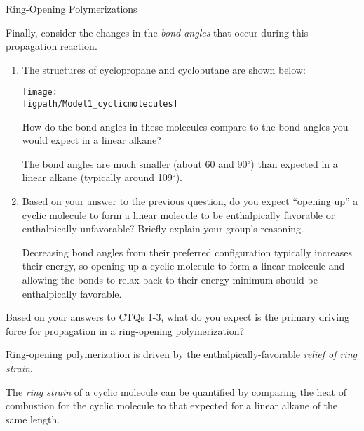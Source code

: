 \begin{activity}{Ring-Opening Polymerizations}
\begin{ctqs}
\begin{enumerate}
		\end{enumerate}
		
	\question Finally, consider the changes in the \emph{bond angles} that occur during this propagation reaction.
	
		\begin{enumerate}
		
			\item The structures of cyclopropane and cyclobutane are shown below:
			
				\centerline{\texttt{[image: \\figpath/Model1\_cyclicmolecules]}}
				
				How do the bond angles in these molecules compare to the bond angles you would expect in a linear alkane?
			
				\begin{solution}[1in]{}
					The bond angles are much smaller (about 60 and 90$^\circ$) than expected in a linear alkane (typically around 109$^\circ$).
				\end{solution}
				
			\item Based on your answer to the previous question, do you expect ``opening up'' a cyclic molecule to form a linear molecule to be enthalpically favorable or enthalpically unfavorable?  Briefly explain your group's reasoning.
			
				\begin{solution}[1in]{}
					Decreasing bond angles from their preferred configuration typically increases their energy, so opening up a cyclic molecule to form a linear molecule and allowing the bonds to relax back to their energy minimum should be enthalpically favorable.
				\end{solution}
			
		\end{enumerate}
		
	\question Based on your answers to CTQs 1-3, what do you expect is the primary driving force for propagation in a ring-opening polymerization?
			
				\begin{solution}[0.75in]{}
					Ring-opening polymerization is driven by the enthalpically-favorable \emph{relief of ring strain}.
				\end{solution}

\end{ctqs}

\begin{infobox}

	The \emph{ring strain} of a cyclic molecule can be quantified by comparing the heat of combustion for the cyclic molecule to that expected for a linear alkane of the same length.
	

\end{infobox}
\end{activity}
